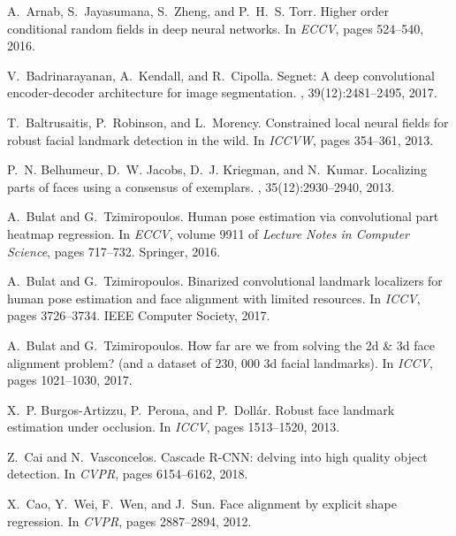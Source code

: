 \documentclass[10pt,twocolumn,letterpaper]{article}
\begin{document}
	{\small
\begin{thebibliography}{100}\itemsep=-1pt

A.~Arnab, S.~Jayasumana, S.~Zheng, and P.~H.~S. Torr.
\newblock Higher order conditional random fields in deep neural networks.
\newblock In {\em {ECCV}}, pages 524--540, 2016.

V.~Badrinarayanan, A.~Kendall, and R.~Cipolla.
\newblock Segnet: {A} deep convolutional encoder-decoder architecture for image
  segmentation.
, 39(12):2481--2495,
  2017.

T.~Baltrusaitis, P.~Robinson, and L.~Morency.
\newblock Constrained local neural fields for robust facial landmark detection
  in the wild.
\newblock In {\em {ICCVW}}, pages 354--361, 2013.

P.~N. Belhumeur, D.~W. Jacobs, D.~J. Kriegman, and N.~Kumar.
\newblock Localizing parts of faces using a consensus of exemplars.
, 35(12):2930--2940,
  2013.

A.~Bulat and G.~Tzimiropoulos.
\newblock Human pose estimation via convolutional part heatmap regression.
\newblock In {\em {ECCV}}, volume 9911 of {\em Lecture Notes in Computer
  Science}, pages 717--732. Springer, 2016.

A.~Bulat and G.~Tzimiropoulos.
\newblock Binarized convolutional landmark localizers for human pose estimation
  and face alignment with limited resources.
\newblock In {\em {ICCV}}, pages 3726--3734. {IEEE} Computer Society, 2017.

A.~Bulat and G.~Tzimiropoulos.
\newblock How far are we from solving the 2d {\&} 3d face alignment problem?
  (and a dataset of 230, 000 3d facial landmarks).
\newblock In {\em {ICCV}}, pages 1021--1030, 2017.

X.~P. Burgos{-}Artizzu, P.~Perona, and P.~Doll{\'{a}}r.
\newblock Robust face landmark estimation under occlusion.
\newblock In {\em {ICCV}}, pages 1513--1520, 2013.

Z.~Cai and N.~Vasconcelos.
\newblock Cascade {R-CNN:} delving into high quality object detection.
\newblock In {\em {CVPR}}, pages 6154--6162, 2018.

X.~Cao, Y.~Wei, F.~Wen, and J.~Sun.
\newblock Face alignment by explicit shape regression.
\newblock In {\em {CVPR}}, pages 2887--2894, 2012.


\end{thebibliography}}
\end{document}
